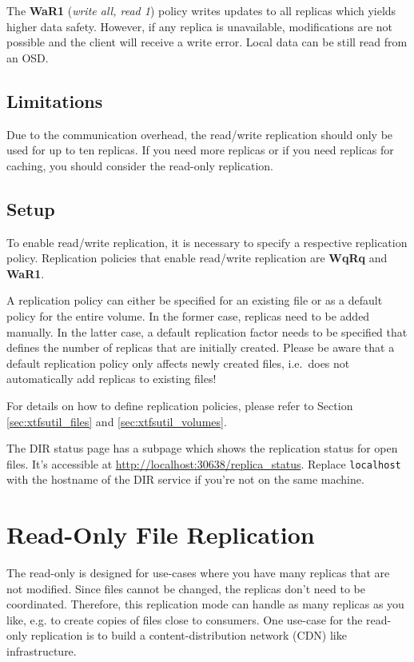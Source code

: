 \documentclass[a4paper,10pt]{book}
\begin{document}
The \textbf{WaR1} (\textit{write all, read 1}) policy writes updates to all replicas which yields higher data safety. However, if any replica is unavailable, modifications are not possible and the client will receive a write error. Local data can be still read from an OSD.

\subsection{Limitations}
Due to the communication overhead, the read/write replication should only be used for up to ten replicas. If you need more replicas or if you need replicas for caching, you should consider the read-only replication.

\subsection{Setup}
To enable read/write replication, it is necessary to specify a respective replication policy. Replication policies that enable read/write replication are \textbf{WqRq} and \textbf{WaR1}.

A replication policy can either be specified for an existing file or as a default policy for the entire volume. In the former case, replicas need to be added manually. In the latter case, a default replication factor needs to be specified that defines the number of replicas that are initially created. Please be aware that a default replication policy only affects newly created files, i.e.\ does not automatically add replicas to existing files!

For details on how to define replication policies, please refer to Section \ref{sec:xtfsutil_files} and \ref{sec:xtfsutil_volumes}.

The DIR status page has a subpage which shows the replication status for open files. It's accessible at \url{http://localhost:30638/replica_status}. Replace \texttt{localhost} with the hostname of the DIR service if you're not on the same machine.

\section{Read-Only File Replication}
\label{sec:ronly_replication}
The read-only is designed for use-cases where you have many replicas that are not modified. Since files cannot be changed, the replicas don't need to be coordinated. Therefore, this replication mode can handle as many replicas as you like, e.g. to create copies of files close to consumers. One use-case for the read-only replication is to build a content-distribution network (CDN) like infrastructure.
\end{document}
